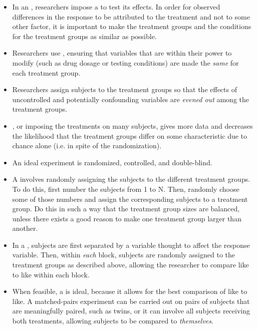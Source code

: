 \begin{itemize}
\item In an , researchers impose a  to test its effects.  In order for observed differences in the response to be attributed to the treatment and not to some other factor, it is important to make the treatment groups and the conditions for the treatment groups as similar as possible.

\item Researchers use , ensuring that variables that are within their power to modify (such as drug dosage or testing conditions) are made the \textit{same} for each treatment group.  

\item Researchers  assign subjects to the treatment groups so that the effects of uncontrolled and potentially confounding variables are \textit{evened out} among the treatment groups.

\item {}, or imposing the treatments on many subjects, gives more data and decreases the likelihood that the treatment groups differ on some characteristic due to chance alone (i.e. in spite of the randomization).  

\item An ideal experiment is randomized, controlled, and double-blind.  

\item A  involves randomly assigning the subjects to the different treatment groups.  To do this, first number the subjects from 1 to N.  Then, randomly choose some of those numbers and assign the corresponding subjects to a treatment group.  Do this in such a way that the treatment group sizes are balanced, unless there exists a good reason to make one treatment group larger than another.

\item In a , subjects are first separated by a variable thought to affect the response variable.  Then, within \textit{each} block, subjects are randomly assigned to the treatment groups as described above, allowing the researcher to compare like to like within each block. 

\item When feasible, a  is ideal, because it allows for the best comparison of like to like.  A matched-pairs experiment can be carried out on pairs of subjects that are meaningfully paired, such as twins, or it can involve all subjects receiving both treatments, allowing subjects to be compared to \textit{themselves}.  


\end{itemize}
